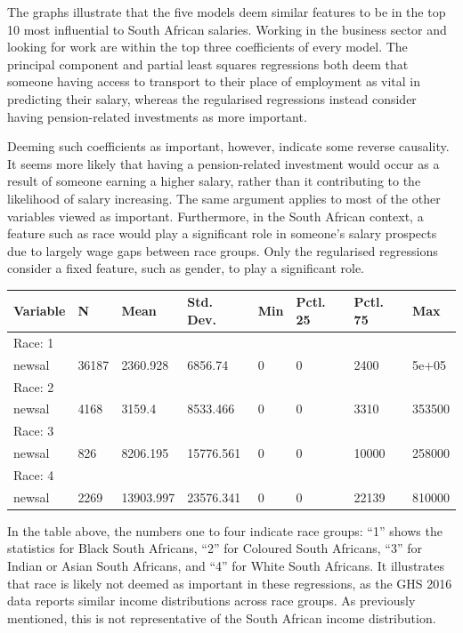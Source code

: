\documentclass[11pt,preprint, authoryear]{elsarticle}
\let\origtable\table
\let\endorigtable\endtable
\renewenvironment{table}[1][2] {
    \expandafter\origtable\expandafter[H]
} {
    \endorigtable
}
\numberwithin{equation}{section}
\numberwithin{figure}{section}
\numberwithin{table}{section}
\begin{document}
The graphs illustrate that the five models deem similar features to be
in the top 10 most influential to South African salaries. Working in the
business sector and looking for work are within the top three
coefficients of every model. The principal component and partial least
squares regressions both deem that someone having access to transport to
their place of employment as vital in predicting their salary, whereas
the regularised regressions instead consider having pension-related
investments as more important.

Deeming such coefficients as important, however, indicate some reverse
causality. It seems more likely that having a pension-related investment
would occur as a result of someone earning a higher salary, rather than
it contributing to the likelihood of salary increasing. The same
argument applies to most of the other variables viewed as important.
Furthermore, in the South African context, a feature such as race would
play a significant role in someone's salary prospects due to largely
wage gaps between race groups. Only the regularised regressions consider
a fixed feature, such as gender, to play a significant role.

\begin{table}

\caption{\label{tab:unnamed-chunk-17}Salary Across Race Groups}
\centering
\begin{tabular}[t]{llllllll}
\toprule
Variable & N & Mean & Std. Dev. & Min & Pctl. 25 & Pctl. 75 & Max\\
\midrule
Race: 1 &  &  &  &  &  &  & \\
newsal & 36187 & 2360.928 & 6856.74 & 0 & 0 & 2400 & 5e+05\\
Race: 2 &  &  &  &  &  &  & \\
newsal & 4168 & 3159.4 & 8533.466 & 0 & 0 & 3310 & 353500\\
Race: 3 &  &  &  &  &  &  & \\
\addlinespace
newsal & 826 & 8206.195 & 15776.561 & 0 & 0 & 10000 & 258000\\
Race: 4 &  &  &  &  &  &  & \\
newsal & 2269 & 13903.997 & 23576.341 & 0 & 0 & 22139 & 810000\\
\bottomrule
\end{tabular}
\end{table}

In the table above, the numbers one to four indicate race groups: ``1''
shows the statistics for Black South Africans, ``2'' for Coloured South
Africans, ``3'' for Indian or Asian South Africans, and ``4'' for White
South Africans. It illustrates that race is likely not deemed as
important in these regressions, as the GHS 2016 data reports similar
income distributions across race groups. As previously mentioned, this
is not representative of the South African income distribution.
\end{document}
